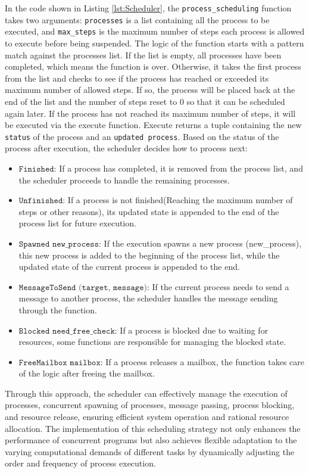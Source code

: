 \documentclass{l4proj}
\begin{document}
In the code shown in Listing \ref{lst:Scheduler}, the \texttt{process\_scheduling} function takes two arguments: \texttt{processes} is a list containing all the process to be executed, and \texttt{max\_steps} is the maximum number of steps each process is allowed to execute before being suspended. The logic of the function starts with a pattern match against the processes list. If the list is empty, all processes have been completed, which means the function is over. Otherwise, it takes the first process from the list and checks to see if the process has reached or exceeded its maximum number of allowed steps. If so, the process will be placed back at the end of the list and the number of steps reset to 0 so that it can be scheduled again later. If the process has not reached its maximum number of steps, it will be executed via the execute function. Execute returns a tuple containing the new \texttt{status} of the process and an \texttt{updated process}. Based on the status of the process after execution, the scheduler decides how to process next:

\begin{itemize}
\item $\texttt{Finished}$: If a process has completed, it is removed from the process list, and the scheduler proceeds to handle the remaining processes.
\item $\texttt{Unfinished}$: If a process is not finished(Reaching the maximum number of steps or other reasons), its updated state is appended to the end of the process list for future execution.
\item $\texttt{Spawned new\_process}$: If the execution spawns a new process (new\_process), this new process is added to the beginning of the process list, while the updated state of the current process is appended to the end.
\item $\texttt{MessageToSend (target, message)}$: If the current process needs to send a message to another process, the scheduler handles the message sending through the function.
\item $\texttt{Blocked need\_free\_check}$: If a process is blocked due to waiting for resources, some functions are responsible for managing the blocked state.
\item $\texttt{FreeMailbox mailbox}$: If a process releases a mailbox, the function takes care of the logic after freeing the mailbox.
\end{itemize}

Through this approach, the scheduler can effectively manage the execution of processes, concurrent spawning of processes, message passing, process blocking, and resource release, ensuring efficient system operation and rational resource allocation. The implementation of this scheduling strategy not only enhances the performance of concurrent programs but also achieves flexible adaptation to the varying computational demands of different tasks by dynamically adjusting the order and frequency of process execution.
\end{document}
